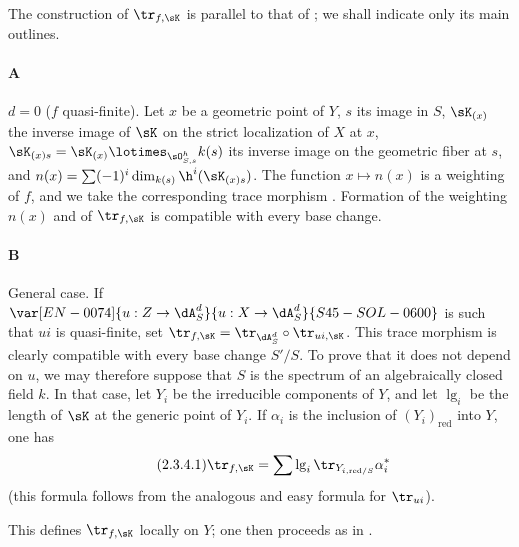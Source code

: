 \subsubsection{}\label{IV:2-3-4}

The construction of $\tr_{f,\sK}$ is parallel to that of
; we shall indicate only its main outlines.

\paragraph{A}
$d=0$ ($f$ quasi-finite). Let $x$ be a geometric point of $Y$, $s$ its image
in $S$, $\sK_{(x)}$ the inverse image of $\sK$ on the strict localization of
$X$ at $x$, $\sK_{(x)s} = \sK_{(x)}\lotimes_{\sO_{S,s}^h} k(s)$ its inverse
image on the geometric fiber at $s$, and
$n(x)=\sum (-1)^i \dim_{k(s)} \h^i(\sK_{(x)s})$. The function
$x\mapsto n(x)$ is a weighting of $f$, and we take the corresponding trace
morphism . Formation of the weighting $n(x)$ and of
$\tr_{f,\sK}$ is compatible with every base change.

\paragraph{B}
General case. If $\var[EN-0074]{u:Z\to \dA_S^d}{u:X\to \dA_S^d}{S45-SOL-0600}$ is such that $u i$ is quasi-finite, set
$\tr_{f,\sK} = \tr_{\dA_S^d}\circ \tr_{u i,\sK}$. This trace morphism is
clearly compatible with every base change $S'/S$. To prove that it does not
depend on $u$, we may therefore suppose that $S$ is the spectrum of an
algebraically closed field $k$. In that case, let $Y_i$ be the irreducible
components of $Y$, and let $\operatorname{lg}_i$ be the length of $\sK$ at
the generic point of $Y_i$. If $\alpha_i$ is the inclusion of
$(Y_i)_\text{red}$ into $Y$, one has
\begin{equation*}\tag{2.3.4.1}\label{IV:eq:2-3-4}
  \tr_{f,\sK} = \sum \operatorname{lg}_i \tr_{Y_{i,\text{red}/S}} \alpha_i^\ast
\end{equation*}
(this formula follows from the analogous and easy formula for $\tr_{u i}$).

This defines $\tr_{f,\sK}$ locally on $Y$; one then proceeds as in
.






